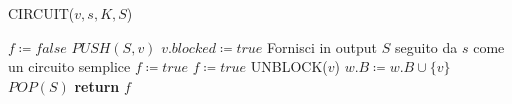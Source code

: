 \begin{algorithm}[H]
    \caption{CIRCUIT($v, s, K, S$)}\label{alg:circuit}
    \begin{algorithmic}[1]
        \State $f \coloneqq false$
        \State $PUSH(S, v)$
        \State $v.blocked \coloneqq true$
                \State Fornisci in output $S$ seguito da $s$ come un circuito semplice
                \State $f \coloneqq true$
             \State $f \coloneqq true$ \EndIf
            \EndIf
        \EndFor
         UNBLOCK($v$)
        \Else
                \State $w.B \coloneqq w.B \cup \{v\}$
            \EndFor
        \EndIf
        \State $POP(S)$ 
        \State \textbf{return} $f$
    \end{algorithmic}
\end{algorithm}

